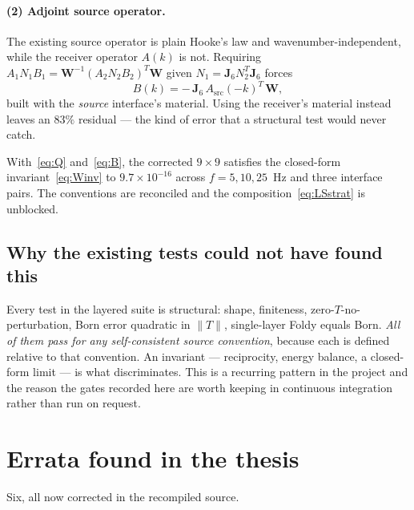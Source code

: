 \documentclass[11pt,a4paper]{article}
\newcommand{\bJ}{\mathbf{J}}
\newcommand{\bW}{\mathbf{W}}
\begin{document}
\paragraph{(2) Adjoint source operator.}  The existing source operator is plain
Hooke's law and wavenumber-independent, while the receiver operator $A(k)$ is
not.  Requiring $A_1N_1B_1 = \bW^{-1}(A_2N_2B_2)^{T}\bW$ given
$N_1 = \bJ_6N_2^{T}\bJ_6$ forces
\begin{equation}\label{eq:B}
  B(k) = -\,\bJ_6\,A_{\mathrm{src}}(-k)^{T}\,\bW,
\end{equation}
built with the \emph{source} interface's material.  Using the receiver's
material instead leaves an $83\%$ residual --- the kind of error that a
structural test would never catch.

With~\eqref{eq:Q} and~\eqref{eq:B}, the corrected $9\times9$ satisfies the
closed-form invariant~\eqref{eq:Winv} to $9.7\times10^{-16}$ across
$f = 5,10,25$~Hz and three interface pairs.  The conventions are reconciled and
the composition~\eqref{eq:LSstrat} is unblocked.

\subsection{Why the existing tests could not have found this}

Every test in the layered suite is structural: shape, finiteness,
zero-$T$-no-perturbation, Born error quadratic in $\lVert T\rVert$,
single-layer Foldy equals Born.  \emph{All of them pass for any self-consistent
source convention}, because each is defined relative to that convention.  An
invariant --- reciprocity, energy balance, a closed-form limit --- is what
discriminates.  This is a recurring pattern in the project and the reason the
gates recorded here are worth keeping in continuous integration rather than
run on request.

\section{Errata found in the thesis}

Six, all now corrected in the recompiled source.
\end{document}
